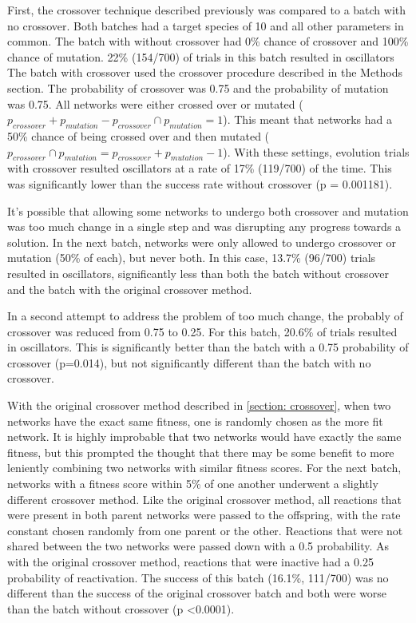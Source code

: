 \documentclass[12pt]{report}
\begin{document}
First, the crossover technique described previously was compared to a batch with no crossover. Both batches had a target species of 10 and all other parameters in common. The batch with without crossover had 0\% chance of crossover and 100\% chance of mutation.  22\% (154/700) of trials in this batch resulted in oscillators The batch with crossover used the crossover procedure described in the Methods section. The probability of crossover was 0.75 and the probability of mutation was 0.75. All networks were either crossed over or mutated ($p_{crossover} + p_{mutation} - p_{crossover} \cap p_{mutation} = 1$). This meant that networks had a 50\% chance of being crossed over and then mutated ($p_{crossover} \cap p_{mutation} = p_{crossover} + p_{mutation} -1$). With these settings, evolution trials with crossover resulted oscillators at a rate of 17\% (119/700) of the time. This was significantly lower than the success rate without crossover (p = 0.001181).

It's possible that allowing some networks to undergo both crossover and mutation was too much change in a single step and was disrupting any progress towards a solution. In the next batch, networks were only allowed to undergo crossover or mutation (50\% of each), but never both. In this case, 13.7\% (96/700) trials resulted in oscillators, significantly less than both the batch without crossover and the batch with the original crossover method.

In a second attempt to address the problem of too much change, the probably of crossover was reduced from 0.75 to 0.25. For this batch, 20.6\% of trials resulted in oscillators. This is significantly better than the batch with a 0.75 probability of crossover (p=0.014), but not significantly different than the batch with no crossover. 

With the original crossover method described in \ref{section: crossover}, when two networks have the exact same fitness, one is randomly chosen as the more fit network. It is highly improbable that two networks would have exactly the same fitness, but this prompted the thought that there may be some benefit to more leniently combining two networks with similar fitness scores. For the next batch, networks with a fitness score within 5\% of one another underwent a slightly different crossover method. Like the original crossover method, all reactions that were present in both parent networks were passed to the offspring, with the rate constant chosen randomly from one parent or the other. Reactions that were not shared between the two networks were passed down with a 0.5 probability. As with the original crossover method, reactions that were inactive had a 0.25 probability of reactivation. The success of this batch (16.1\%, 111/700) was no different than the success of the original crossover batch and both were worse than the batch without crossover (p \textless 0.0001).
\end{document}
